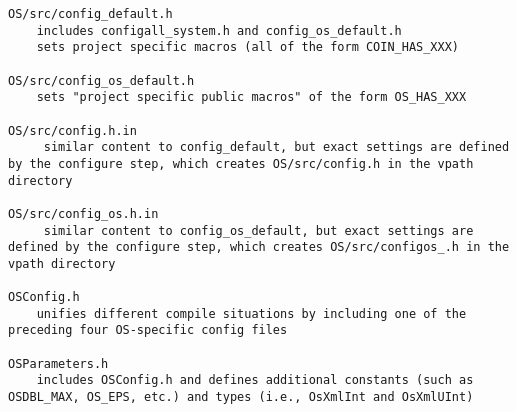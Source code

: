 \begin{verbatim}
OS/src/config_default.h
    includes configall_system.h and config_os_default.h
    sets project specific macros (all of the form COIN_HAS_XXX)

OS/src/config_os_default.h
    sets "project specific public macros" of the form OS_HAS_XXX

OS/src/config.h.in
     similar content to config_default, but exact settings are defined by the configure step, which creates OS/src/config.h in the vpath directory

OS/src/config_os.h.in
     similar content to config_os_default, but exact settings are defined by the configure step, which creates OS/src/configos_.h in the vpath directory

OSConfig.h
    unifies different compile situations by including one of the preceding four OS-specific config files

OSParameters.h
    includes OSConfig.h and defines additional constants (such as OSDBL_MAX, OS_EPS, etc.) and types (i.e., OsXmlInt and OsXmlUInt)
\end{verbatim}

